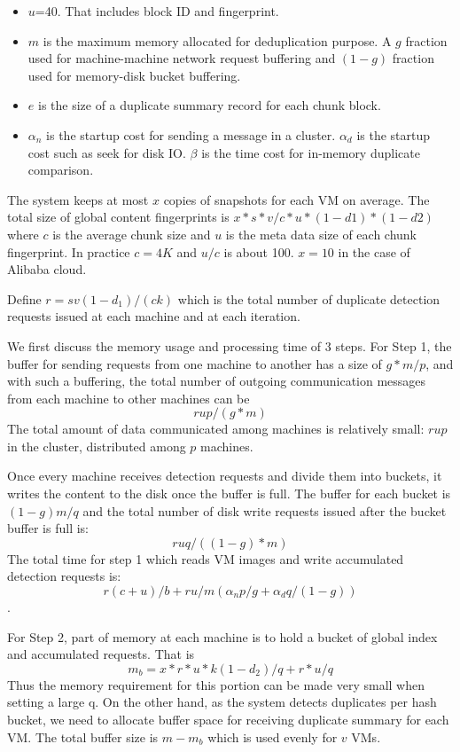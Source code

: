 \begin{itemize}
\item $u$=40. That includes block ID and fingerprint.
\item $m$ is the maximum memory allocated for deduplication purpose.  A $g$ fraction used for 
machine-machine network  request buffering and $(1-g)$ fraction used for memory-disk bucket buffering.
\item $e$ is the size of a duplicate summary record for each chunk block.
\item $\alpha_n$ is the startup cost for sending a message in a cluster. $\alpha_d$ is the startup cost 
such as seek for disk IO. $\beta$ is the time cost for in-memory duplicate comparison.
\end{itemize}
The system keeps at most  $ x$ copies of snapshots for each VM on average.  The total size of  global content fingerprints is $x*s*v/c*u *(1-d1)*(1-d2)$ where $c$ is the average chunk size and $u$ is the meta data size of each chunk fingerprint. In practice $c=4K$ and $u/c$  is about 100.  $x=10$ in the case of Alibaba cloud.

Define $r = s v (1-d_1)/(ck)$  which is the total number of duplicate detection requests issued at each machine and at each iteration.

We first discuss the memory usage and processing time  of 3 steps. 
 For Step 1,  the buffer for sending requests from one machine to another has a size of  $g*m/p$, and with such a buffering, the total number of outgoing communication messages from  each machine to other machines  can be 
\[
r u p/(g*m)
\]
The total  amount of data communicated among machines is relatively small: $r u p$ in the cluster, distributed among $p$ machines.

Once every machine receives detection requests and divide them into buckets, it writes the content to the disk once the buffer is full. The buffer for each bucket is $(1-g)m/q$ and the total number of disk write requests issued after the bucket buffer is full is:
\[
r u q/((1-g)*m)
\]
The total time for step 1  which  reads VM images and write accumulated detection requests  is:   
\[
r  ( c+  u) /b   +r u /m (\alpha_n  p/g  + \alpha_d q/(1-g)  )
\].

For Step 2,  part of memory at each machine is  to hold  a bucket of global index and accumulated requests. That is
\[
m_b= x*r *u*k(1-d_2)/q + r*u/q
\]
Thus the memory requirement for this portion can be made very small when setting a large q. On the other hand, as the system detects duplicates per hash bucket, we need to allocate buffer space for receiving  duplicate summary for each VM.  The total buffer size is $m-m_b$ which is used evenly for $v$ VMs.

